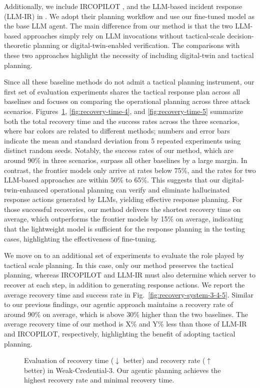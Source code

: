 \documentclass[sigconf]{acmart}
\begin{document}
Additionally, we include IRCOPILOT \cite{guo25ircopilot}, and the LLM-based incident response (LLM-IR) in \cite{kim26ndss}. We adopt their planning workflow and use our fine-tuned model as the base LLM agent. The main difference from our method is that the two LLM-based approaches simply rely on LLM invocations without tactical-scale decision-theoretic planning or digital-twin-enabled verification. The comparisons with these two approaches highlight the necessity of including digital-twin and tactical planning.

Since all these baseline methods do not admit a tactical planning instrument, our first set of evaluation experiments shares the tactical response plan across all baselines and focuses on comparing the operational planning across three attack scenarios. Figures~\ref{fig:recovery-time-3}, \ref{fig:recovery-time-4}, and \ref{fig:recovery-time-5} summarize both the total recovery time and the success rates across the three scenarios, where bar colors are related to different methods; numbers and error bars indicate the mean and standard deviation from 5 repeated experiments using distinct random seeds. Notably, the success rates of our method, which are around 90\% in three scenarios, surpass all other baselines by a large margin. In contrast, the frontier models only arrive at rates below 75\%, and the rates for two LLM-based approaches are within 50\% to 65\%. This suggests that our digital-twin-enhanced operational planning can verify and eliminate hallucinated response actions generated by LLMs, yielding effective response planning.  For those successful recoveries, our method delivers the shortest recovery time on average, which outperforms the frontier models by 15\% on average, indicating that the lightweight model is sufficient for the response planning in the testing cases, highlighting the effectiveness of fine-tuning.

We move on to an additional set of experiments to evaluate the role played by tactical scale planning. In this case, only our method preserves the tactical planning, whereas IRCOPILOT and LLM-IR must also determine which server to recover at each step, in addition to generating response actions. We report the average recovery time and success rate in Fig.~\ref{fig:recovery-system-3-4-5}. Similar to our previous findings, our agentic approach maintains a recovery rate of around 90\% on average, which is above 30\% higher than the two baselines. The average recovery time of our method is X\% and Y\% less than those of LLM-IR and IRCOPILOT, respectively, highlighting the benefit of adopting tactical planning.  
\begin{figure}[t]
  \scalebox{0.8}{    
\centering

}
\caption{Evaluation of recovery time ($\downarrow$ better) and recovery rate ($\uparrow$ better) in Weak-Credential-3. Our agentic planning achieves the highest recovery rate and minimal recovery time.}
\label{fig:recovery-time-3}
\end{figure}
\end{document}
